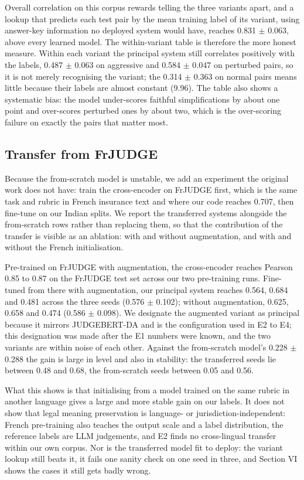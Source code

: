 \documentclass[conference]{IEEEtran}
\begin{document}
Overall correlation on this corpus rewards telling the three variants apart, and a lookup that predicts each test pair by the mean training label of its variant, using answer-key information no deployed system would have, reaches 0.831 \ensuremath{\pm} 0.063, above every learned model. The within-variant table is therefore the more honest measure. Within each variant the principal system still correlates positively with the labels, 0.487 \ensuremath{\pm} 0.063 on aggressive and 0.584 \ensuremath{\pm} 0.047 on perturbed pairs, so it is not merely recognising the variant; the 0.314 \ensuremath{\pm} 0.363 on normal pairs means little because their labels are almost constant (9.96). The table also shows a systematic bias: the model under-scores faithful simplifications by about one point and over-scores perturbed ones by about two, which is the over-scoring failure on exactly the pairs that matter most.

\subsection{Transfer from FrJUDGE}

Because the from-scratch model is unstable, we add an experiment the original work does not have: train the cross-encoder on FrJUDGE first, which is the same task and rubric in French insurance text and where our code reaches 0.707, then fine-tune on our Indian splits. We report the transferred systems alongside the from-scratch rows rather than replacing them, so that the contribution of the transfer is visible as an ablation: with and without augmentation, and with and without the French initialisation.

Pre-trained on FrJUDGE with augmentation, the cross-encoder reaches Pearson 0.85 to 0.87 on the FrJUDGE test set across our two pre-training runs. Fine-tuned from there with augmentation, our principal system reaches 0.564, 0.684 and 0.481 across the three seeds (0.576 \ensuremath{\pm} 0.102); without augmentation, 0.625, 0.658 and 0.474 (0.586 \ensuremath{\pm} 0.098). We designate the augmented variant as principal because it mirrors JUDGEBERT-DA and is the configuration used in E2 to E4; this designation was made after the E1 numbers were known, and the two variants are within noise of each other. Against the from-scratch model's 0.228 \ensuremath{\pm} 0.288 the gain is large in level and also in stability: the transferred seeds lie between 0.48 and 0.68, the from-scratch seeds between 0.05 and 0.56.

What this shows is that initialising from a model trained on the same rubric in another language gives a large and more stable gain on our labels. It does not show that legal meaning preservation is language- or jurisdiction-independent: French pre-training also teaches the output scale and a label distribution, the reference labels are LLM judgements, and E2 finds no cross-lingual transfer within our own corpus. Nor is the transferred model fit to deploy: the variant lookup still beats it, it fails one sanity check on one seed in three, and Section VI shows the cases it still gets badly wrong.
\end{document}
